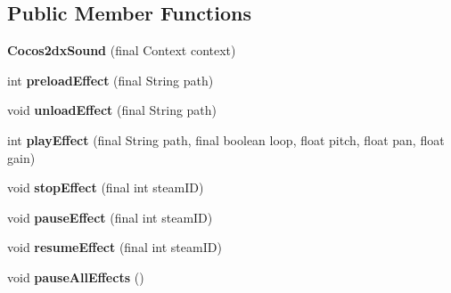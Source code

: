 \subsection*{Public Member Functions}
\begin{DoxyCompactItemize}
\item 
\mbox{\label{classorg_1_1cocos2dx_1_1lib_1_1Cocos2dxSound_aee5430342024da4da48454b017063ac6}} 
{\bfseries Cocos2dx\+Sound} (final Context context)
\item 
\mbox{\label{classorg_1_1cocos2dx_1_1lib_1_1Cocos2dxSound_a644b4cd4f9cad24b8f9395a4ecfca131}} 
int {\bfseries preload\+Effect} (final String path)
\item 
\mbox{\label{classorg_1_1cocos2dx_1_1lib_1_1Cocos2dxSound_a79a0a0c1bd6e4c577edb2a379a6c5bb6}} 
void {\bfseries unload\+Effect} (final String path)
\item 
\mbox{\label{classorg_1_1cocos2dx_1_1lib_1_1Cocos2dxSound_af484b4112bba866a689c4a06fd5348ea}} 
int {\bfseries play\+Effect} (final String path, final boolean loop, float pitch, float pan, float gain)
\item 
\mbox{\label{classorg_1_1cocos2dx_1_1lib_1_1Cocos2dxSound_a8997653d75fd04b857c796f0e04327e0}} 
void {\bfseries stop\+Effect} (final int steam\+ID)
\item 
\mbox{\label{classorg_1_1cocos2dx_1_1lib_1_1Cocos2dxSound_a0098df4c5ad674b8f9445a113c8a6072}} 
void {\bfseries pause\+Effect} (final int steam\+ID)
\item 
\mbox{\label{classorg_1_1cocos2dx_1_1lib_1_1Cocos2dxSound_a56440b929e50100b720cc1c210afab27}} 
void {\bfseries resume\+Effect} (final int steam\+ID)
\item 
\mbox{\label{classorg_1_1cocos2dx_1_1lib_1_1Cocos2dxSound_a897fda1205b6dc9018f2eacd525bff9d}} 
void {\bfseries pause\+All\+Effects} ()
\item 

\end{DoxyCompactItemize}
